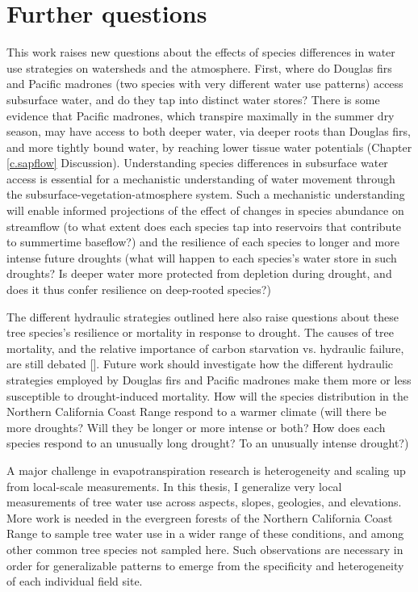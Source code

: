 \section{Further questions}

This work raises new questions about the effects of species differences in water use strategies on watersheds and the atmosphere.  First, where do Douglas firs and Pacific madrones (two species with very different water use patterns) access subsurface water, and do they tap into distinct water stores?  There is some evidence that Pacific madrones, which transpire maximally in the summer dry season, may have access to both deeper water, via deeper roots than Douglas firs, and more tightly bound water, by reaching lower tissue water potentials (Chapter \ref{c.sapflow} Discussion).  Understanding species differences in subsurface water access is essential for a mechanistic understanding of water movement through the subsurface-vegetation-atmosphere system.  Such a mechanistic understanding will enable informed projections of the effect of changes in species abundance on streamflow (to what extent does each species tap into reservoirs that contribute to summertime baseflow?) and the resilience of each species to longer and more intense future droughts (what will happen to each species's water store in such droughts?  Is deeper water more protected from depletion during drought, and does it thus confer resilience on deep-rooted species?)

The different hydraulic strategies outlined here also raise questions about these tree species's resilience or mortality in response to drought.  The causes of tree mortality, and the relative importance of carbon starvation vs. hydraulic failure, are still debated [\cite{sala2010physiological}].  Future work should investigate how the different hydraulic strategies employed by Douglas firs and Pacific madrones make them more or less susceptible to drought-induced mortality.  How will the species distribution in the Northern California Coast Range respond to a warmer climate (will there be more droughts? Will they be longer or more intense or both?  How does each species respond to an unusually long drought?  To an unusually intense drought?)

A major challenge in evapotranspiration research is heterogeneity and scaling up from local-scale measurements.  In this thesis, I generalize very local measurements of tree water use across aspects, slopes, geologies, and elevations.  More work is needed in the evergreen forests of the Northern California Coast Range to sample tree water use in a wider range of these conditions, and among other common tree species not sampled here.  Such observations are necessary in order for generalizable patterns to emerge from the specificity and heterogeneity of each individual field site.

